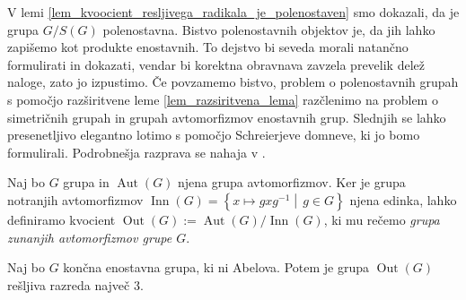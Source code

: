 
V lemi \ref{lem_kvoocient_resljivega_radikala_je_polenostaven} smo dokazali, da je grupa $G / S(G)$ polenostavna. Bistvo polenostavnih objektov je, da jih lahko zapišemo kot produkte enostavnih.
To dejstvo bi seveda morali natančno formulirati in dokazati, vendar bi korektna obravnava zavzela prevelik delež naloge, zato jo izpustimo.
Če povzamemo bistvo, problem o polenostavnih grupah s pomočjo razširitvene leme \ref{lem_razsiritvena_lema} razčlenimo na problem o simetričnih grupah in grupah avtomorfizmov enostavnih grup. Slednjih se lahko presenetljivo elegantno lotimo s pomočjo Schreierjeve domneve, ki jo bomo formulirali.
Podrobnešja razprava se nahaja v \cite[28--31]{Schneider_2016}.  

\begin{definicija}
\label{def_grupa_zunanjih_avtomorfizmov}
Naj bo $G$ grupa in $\operatorname{Aut}(G)$ njena grupa avtomorfizmov. Ker je grupa notranjih avtomorfizmov $\operatorname{Inn}(G) = \left\{ x \mapsto g x g^{-1}  \middle|\,  g \in G  \right\}$ njena edinka,
lahko definiramo kvocient $\operatorname{Out}(G) :=  \operatorname{Aut}(G)  /  \operatorname{Inn}(G)$, ki mu rečemo \emph{grupa zunanjih avtomorfizmov grupe $G$}. 
\end{definicija}

\begin{izrek}
\label{izr_Schreierjeva_domneva}
 Naj bo $G$ končna enostavna grupa, ki ni Abelova. Potem je grupa $\operatorname{Out}(G)$ rešljiva razreda največ $3$.
\end{izrek}

